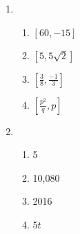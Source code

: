 \documentclass{article}
\begin{document}
\begin{enumerate}
\begin{enumerate}
	\end{enumerate}
	
\item

	\begin{enumerate}
	
	\item $[60, -15]$
	
	\item $[5, 5\sqrt{2}]$
	
	\item $[\frac{3}{8}, \frac{-1}{3}]$
	
	\item $[\frac{p^2}{q}, p]$
	
	\end{enumerate}
	
\item

	\begin{enumerate}
	
	\item 5
	
	\item 10,080
	
	\item 2016
	
	\item $5t$
	
	\end{enumerate}

\end{enumerate}
\end{document}
